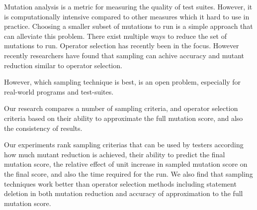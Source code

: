 Mutation analysis is a metric for measuring the quality of test suites. However, it is computationally intensive compared to other measures which it hard to use in practice. Choosing a smaller subset of mutations to run is a simple approach that can alleviate this problem. There exist multiple ways to reduce the set of mutations to run. Operator selection has recently been in the focus. However recently researchers have found that sampling can achive accuracy and mutant reduction similar to operator selection.

However, which sampling technique is best, is an open problem, especially for real-world programs and test-suites.

Our research compares a number of sampling criteria, and operator selection criteria based on their ability to approximate the full mutation score, and also the consistency of results.

Our experiments rank sampling criterias that can be used by testers according how much mutant reduction is achieved, their ability to predict the final mutation score, the relative effect of unit increase in sampled mutation score on the final score, and also the time required for the run. We also find that sampling techniques work better than operator selection methods including statement deletion in both mutation reduction and accuracy of approximation to the full mutation score.


